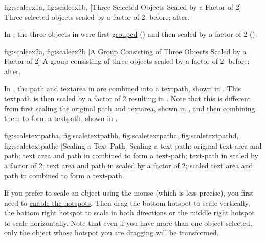 {
 {fig:scaleex1a}{}{},
 {fig:scaleex1b}{}{},
}
[Three Selected Objects Scaled by a Factor of 2]
{Three selected objects scaled by a factor of 2:
 before;
 after.}

In , the three objects in
 were first
\hyperref[sec:grouping]{grouped} ()
and then scaled by a factor of 2 ().

{
 {fig:scaleex2a}{}{},
 {fig:scaleex2b}{}{}
}
[A Group Consisting of Three Objects Scaled by a Factor of 2]
{A group consisting of three objects scaled by a factor of 2:
 before;
 after.}

In , the \gls*{path} and
\gls*{textarea} in  are combined
into a \gls*{textpath}, shown in
. This \gls*{textpath} is then
scaled by a factor of 2 resulting in
. Note that this is different
from first scaling the original \gls*{path} and \gls*{textarea},
shown in , and then combining
them to form a \gls*{textpath}, shown in
.

{
 {fig:scaletextpatha}{}{},
 {fig:scaletextpathb}{}{},
 {fig:scaletextpathc}{}{},
 {fig:scaletextpathd}{}{},
 {fig:scaletextpathe}{}{}
}
[Scaling a Text-Path]
{Scaling a text-path:
 original text area and path;
 text area and path in
 combined to form a text-path;
 text-path 
in  scaled by a factor of 2;
 text area and path 
in  scaled by a factor of 2;
 scaled text area and path 
in  combined to form a text-path.}

If you prefer to scale an \gls{object} using the mouse (which is
less precise), you first need to \hyperref[mi:hotspots]{enable the
hotspots}. Then drag the bottom  hotspot to scale
vertically, the bottom right hotspot to scale in both directions or
the middle right hotspot to scale horizontally. Note that even if
you have more than one object selected, only the object whose
hotspot you are dragging will be transformed.

